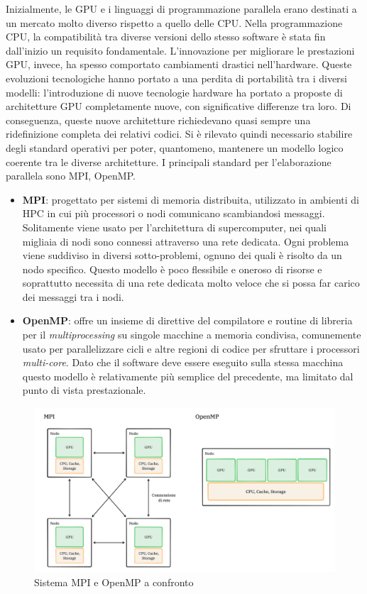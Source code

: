 Inizialmente, le \gls{GPU} e i linguaggi di programmazione parallela erano destinati a un mercato molto diverso rispetto a quello delle \gls{CPU}. Nella programmazione \gls{CPU}, la compatibilità tra diverse versioni dello stesso software è stata fin dall'inizio un requisito fondamentale. L'innovazione per migliorare le prestazioni \gls{GPU}, invece, ha spesso comportato cambiamenti drastici nell'hardware. Queste evoluzioni tecnologiche hanno portato a una perdita di portabilità tra i diversi modelli: l'introduzione di nuove tecnologie hardware ha portato a proposte di architetture \gls{GPU} completamente nuove, con significative differenze tra loro. Di conseguenza, queste nuove architetture richiedevano quasi sempre una ridefinizione completa dei relativi codici. Si è rilevato quindi necessario stabilire degli standard operativi per poter, quantomeno, mantenere un modello logico coerente tra le diverse architetture.
I principali standard per l'elaborazione parallela sono MPI, OpenMP.

\begin{itemize}
    \item \textbf{MPI}: progettato per sistemi di memoria distribuita, utilizzato in ambienti di \gls{HPC} in cui più processori o nodi comunicano scambiandosi messaggi. Solitamente viene usato per l'architettura di supercomputer, nei quali migliaia di nodi sono connessi attraverso una rete dedicata. Ogni problema viene suddiviso in diversi sotto-problemi, ognuno dei quali è risolto da un nodo specifico. Questo modello è poco flessibile e oneroso di risorse e soprattutto necessita di una rete dedicata molto veloce che si possa far carico dei messaggi tra i nodi.
    \item \textbf{OpenMP}: offre un insieme di direttive del compilatore e routine di libreria per il \textit{multiprocessing} su singole macchine a memoria condivisa, comunemente usato per parallelizzare cicli e altre regioni di codice per sfruttare i processori \textit{multi-core}. Dato che il software deve essere eseguito sulla stessa macchina questo modello è relativamente più semplice del precedente, ma limitato dal punto di vista prestazionale.
\end{itemize}

\begin{figure}[ht]
    \centering
    \includegraphics[width=.95\linewidth]{images/chapter2/mpi_openmp.png}
    \caption{Sistema MPI e OpenMP a confronto}
    \label{fig:mpi_openmp}
\end{figure}

